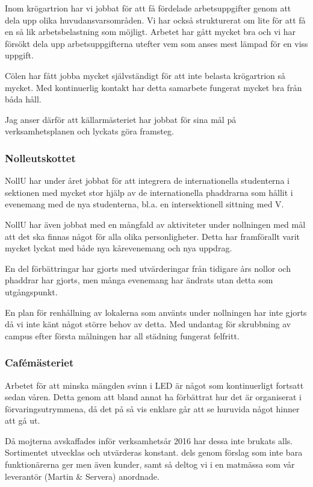 \documentclass[../_main/handlingar.tex]{subfiles}
\begin{document}
Inom krögartrion har vi jobbat för att få fördelade arbetsuppgifter genom att dela upp olika huvudansvarsområden. Vi har också strukturerat om lite för att få en så lik arbetsbelastning som möjligt. Arbetet har gått mycket bra och vi har försökt dela upp arbetsuppgifterna utefter vem som anses mest lämpad för en viss uppgift.

Cölen har fått jobba mycket självständigt för att inte belasta krögartrion så mycket. Med kontinuerlig kontakt har detta samarbete fungerat mycket bra från båda håll.

Jag anser därför att källarmästeriet har jobbat för sina mål på verksamhetsplanen och lyckats göra framsteg.

\newpage
\subsubsection*{Nolleutskottet}
NollU har under året jobbat för att integrera de internationella studenterna i sektionen med mycket stor hjälp av de internationella phaddrarna som hållit i evenemang med de nya studenterna, bl.a. en intersektionell sittning med V.

NollU har även jobbat med en mångfald av aktiviteter under nollningen med mål att det ska finnas något för alla olika personligheter. Detta har framförallt varit mycket lyckat med både nya kårevenemang och nya uppdrag.

En del förbättringar har gjorts med utvärderingar från tidigare års nollor och phaddrar har gjorts, men många evenemang har ändrats utan detta som utgångspunkt.

En plan för renhållning av lokalerna som använts under nollningen har inte gjorts då vi inte känt något större behov av detta. Med undantag för skrubbning av campus efter första målningen har all städning fungerat felfritt.

\subsubsection*{Cafémästeriet}
Arbetet för att minska mängden svinn i LED är något som kontinuerligt fortsatt sedan våren. Detta genom att bland annat ha förbättrat hur det är organiserat i förvaringsutrymmena, då det på så vis enklare går att se huruvida något hinner att gå ut.

Då mojterna avskaffades inför verksamhetsår 2016 har dessa inte brukats alls.
Sortimentet utvecklas och utvärderas konstant. dels genom förslag som inte bara funktionärerna ger men även kunder, samt så deltog vi i en matmässa som vår leverantör (Martin \& Servera) anordnade.
\end{document}
